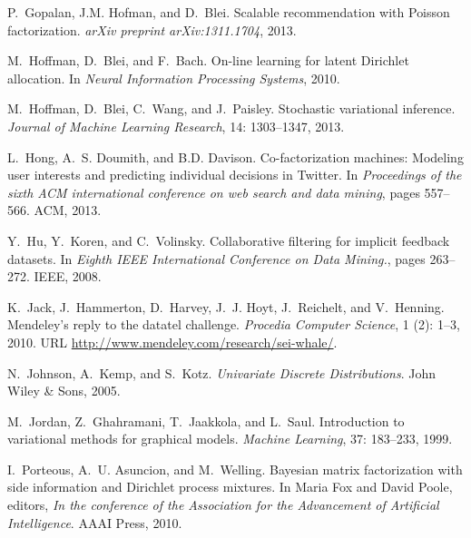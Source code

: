 \documentclass{article}
\begin{document}
{\begin{thebibliography}{25}
P.~Gopalan, J.M. Hofman, and D.~Blei.
\newblock Scalable recommendation with {P}oisson factorization.
\newblock \emph{arXiv preprint arXiv:1311.1704}, 2013.

M.~Hoffman, D.~Blei, and F.~Bach.
\newblock On-line learning for latent {D}irichlet allocation.
\newblock In \emph{Neural Information Processing Systems}, 2010.

M.~Hoffman, D.~Blei, C.~Wang, and J.~Paisley.
\newblock Stochastic variational inference.
\newblock \emph{Journal of Machine Learning Research}, 14: 1303--1347,
  2013.

L.~Hong, A.~S. Doumith, and B.D. Davison.
\newblock Co-factorization machines: {M}odeling user interests and predicting
  individual decisions in {T}witter.
\newblock In \emph{Proceedings of the sixth ACM international conference on web
  search and data mining}, pages 557--566. ACM, 2013.

Y.~Hu, Y.~Koren, and C.~Volinsky.
\newblock Collaborative filtering for implicit feedback datasets.
\newblock In \emph{Eighth IEEE International Conference on Data Mining.}, pages
  263--272. IEEE, 2008.

K.~Jack, J.~Hammerton, D.~Harvey, J.~J. Hoyt, J.~Reichelt, and V.~Henning.
\newblock Mendeley's reply to the datatel challenge.
\newblock \emph{Procedia Computer Science}, 1 (2): 1--3,
  2010.
\newblock URL \url{http://www.mendeley.com/research/sei-whale/}.

N.~Johnson, A.~Kemp, and S.~Kotz.
\newblock \emph{Univariate Discrete Distributions}.
\newblock John Wiley \& Sons, 2005.

M.~Jordan, Z.~Ghahramani, T.~Jaakkola, and L.~Saul.
\newblock Introduction to variational methods for graphical models.
\newblock \emph{Machine Learning}, 37: 183--233, 1999.

I.~Porteous, A.~U. Asuncion, and M.~Welling.
\newblock Bayesian matrix factorization with side information and {D}irichlet
  process mixtures.
\newblock In Maria Fox and David Poole, editors, \emph{In the conference of the
  Association for the Advancement of Artificial Intelligence}. AAAI Press,
  2010.


\end{thebibliography}}
\end{document}
